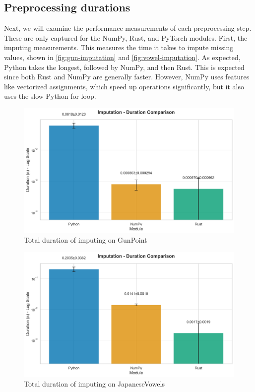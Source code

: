 \documentclass[review]{AIM_report}
\begin{document}
\subsection{Preprocessing durations}
Next, we will examine the performance measurements of each preprocessing step. These are only captured for the NumPy, Rust, and PyTorch modules. First, the imputing measurements. This measures the time it takes to impute missing values, shown in \autoref{fig:gun-imputation} and \autoref{fig:vowel-imputation}. As expected, Python takes the longest, followed by NumPy, and then Rust. This is expected since both Rust and NumPy are generally faster. However, NumPy uses features like vectorized assignments, which speed up operations significantly, but it also uses the slow Python for-loop.
\begin{figure}[H]
    \centering
    \includegraphics[width=\figsize\textwidth]{files/benchmarking/methods_gunpoint/imputation_comparison.png}
    \caption{Total duration of imputing on GunPoint}
    \label{fig:gun-imputation}
\end{figure}
\begin{figure}[H]
    \centering
    \includegraphics[width=\figsize\textwidth]{files/benchmarking/methods_vowels/imputation_comparison.png}
    \caption{Total duration of imputing on JapaneseVowels}
    \label{fig:vowel-imputation}
\end{figure}
\end{document}
